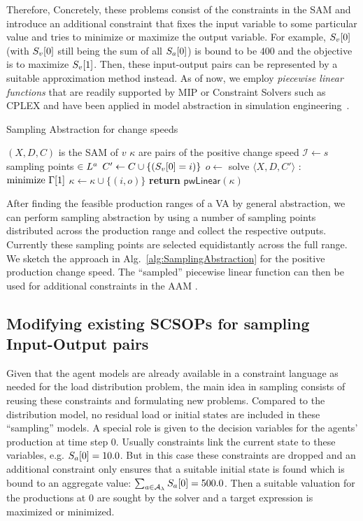 \documentclass[conference]{IEEEtran}
\newcommand{\aref}[1]{Alg.~\ref{#1}}
\begin{document}
Therefore, Concretely, these problems consist of the constraints in the SAM and introduce an additional constraint that fixes the input variable to some particular value and tries to minimize or maximize the output variable. For example, $\AgentPower{0}{v}$ (with  $\AgentPower{0}{v}$ still being the sum of all $\AgentPower{0}{a}$) is bound to be $400$ and the objective is to maximize $\AgentPower{1}{v}$.  Then, these input-output pairs can be represented by a suitable approximation method instead. As of now, we employ \emph{piecewise linear functions} that are readily supported by MIP or Constraint Solvers such as CPLEX and have been applied in model abstraction in simulation engineering~\cite{Frantz_Taxonomy}.
%
\begin{algorithm}
\caption{Sampling Abstraction for change speeds}\label{alg:SamplingAbstraction}
\begin{algorithmic}[1]
\Require $(X, D, C)$ is the SAM of $v$
\Ensure $\kappa$ are pairs of the positive change speed
\State $\mathcal{I} \gets s$ sampling points $\in \ListSym^a$
\State $C' \gets C \cup \{(\AgentPower{0}{v} = i)\}$
\State $o \gets $ solve $\langle X, D, C'\rangle$ : $\text{minimize } \CostsObjective[1]$
\State $\kappa \gets \kappa \cup \{(i,o)\}$
\EndFor
\State \textbf{return} $\mathsf{pwLinear}(\kappa)$ 
\EndProcedure
\end{algorithmic}
\end{algorithm}
%
After finding the feasible production ranges of a VA by general abstraction, we can perform sampling abstraction by using a number of sampling points distributed across the production range and collect the respective outputs. Currently these sampling points are selected equidistantly across the full range. We sketch the approach in \aref{alg:SamplingAbstraction} for the positive production change speed. The ``sampled'' piecewise linear function can then be used for additional constraints in the AAM .
\subsection{Modifying existing SCSOPs for sampling Input-Output pairs}
Given that the agent models are already available in a constraint language as needed for the load distribution problem, the main idea in sampling consists of reusing these constraints and formulating new problems. Compared to the distribution model, no residual load or initial states are included in these ``sampling'' models. A special role is given to the decision variables for the agents' production at time step 0. Usually constraints link the current state to these variables, e.g. $\AgentPower{0}{a} = 10.0$. But in this case these constraints are dropped and an additional constraint only ensures that a suitable initial state is found which is bound to an aggregate value: $\sum_{a \in \Subsystem} \AgentPower{0}{a} = 500.0$. Then a suitable valuation for the productions at $0$ are sought by the solver and a target expression is maximized or minimized.
\end{document}
